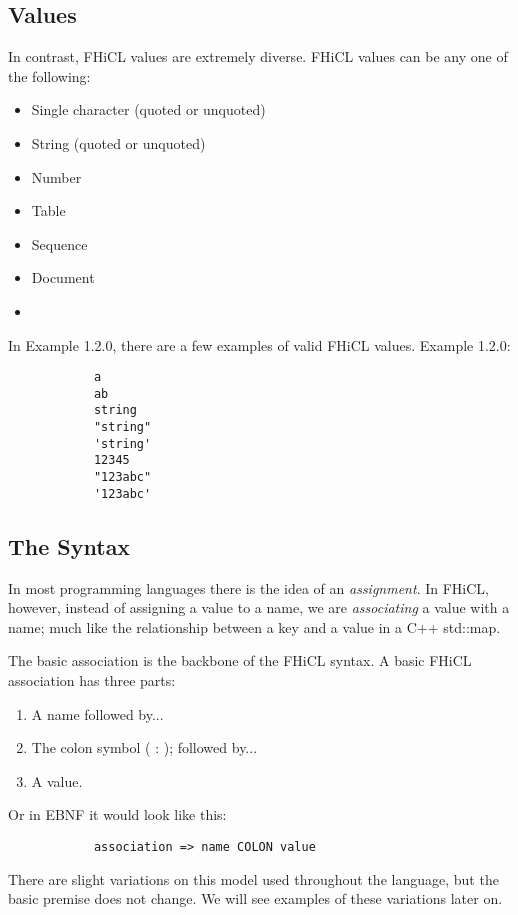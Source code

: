 \documentclass{memarticle}
\begin{document}
	\subsection{Values}
		In contrast, FHiCL values are extremely diverse.
		FHiCL values can be any one of the following:
		\begin{itemize}
			\item Single character (quoted or unquoted)
			\item String (quoted or unquoted)
			\item Number
			\item Table
			\item Sequence
			\item Document
			\item 
		\end{itemize}
		\par
		In Example 1.2.0, there are a few examples of valid FHiCL values.
		Example 1.2.0:
		\begin{verbatim}
			a
			ab
			string
			"string"
			'string'
			12345
			"123abc"
			'123abc'
		\end{verbatim}
	\subsection{The Syntax}
		In most programming languages there is the idea of an \emph{assignment}. 
		In FHiCL, however, instead of assigning a value to a name, 
		we are \emph{associating} a value with a name; 
		much like the relationship between a key and a value in a C++ std::map.
		\par
		The basic association is the backbone of the FHiCL syntax.
		A basic FHiCL association has three parts:
		\begin{enumerate}
			\item A name followed by...
			\item The colon symbol ( : ); followed by...
			\item A value.
		\end{enumerate}
		\par
		Or in EBNF it would look like this:
		\begin{verbatim}
			association => name COLON value
		\end{verbatim}
		\par
		There are slight variations on this model used throughout the language,
		but the basic premise does not change. 
		We will see examples of these variations later on.
\end{document}
